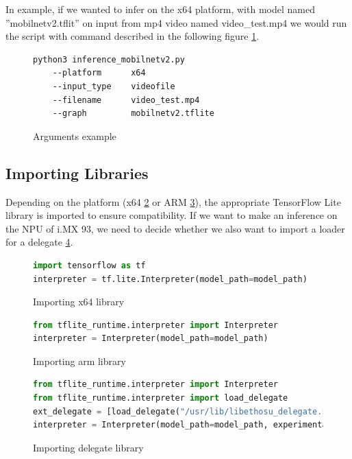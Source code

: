 In example, if we wanted to infer on the x64 platform, with model named ''mobilnetv2.tflit'' on input from mp4 video named video\_test.mp4 we would run the script with command described in the following figure \ref{code:arg_example}.

\begin{figure}[H]
\begin{lstlisting}[language=Bash]
python3 inference_mobilnetv2.py 
    --platform      x64
    --input_type    videofile
    --filename      video_test.mp4
    --graph         mobilnetv2.tflite
\end{lstlisting}
\caption{Arguments example}
\label{code:arg_example}
\end{figure}

\subsection{Importing Libraries}
Depending on the platform (x64 \ref{code:import_libraries} or ARM \ref{code:import_libraries_arm}), the appropriate TensorFlow Lite library is imported to ensure compatibility. If we want to make an inference on the NPU of i.MX 93, we need to decide whether we also want to import a loader for a delegate \ref{code:import_libraries_arm_npu}.

\begin{figure}[H]
\begin{lstlisting}[language=Python]
import tensorflow as tf
interpreter = tf.lite.Interpreter(model_path=model_path)
\end{lstlisting}
\caption{Importing x64 library}
\label{code:import_libraries}
\end{figure}

\begin{figure}[H]
\begin{lstlisting}[language=Python]
from tflite_runtime.interpreter import Interpreter
interpreter = Interpreter(model_path=model_path)

\end{lstlisting}
\caption{Importing arm library}
\label{code:import_libraries_arm}
\end{figure}

\begin{figure}[H]
\begin{lstlisting}[language=Python]
from tflite_runtime.interpreter import Interpreter
from tflite_runtime.interpreter import load_delegate
ext_delegate = [load_delegate("/usr/lib/libethosu_delegate.so")]
interpreter = Interpreter(model_path=model_path, experimental_delegates=ext_delegate)
\end{lstlisting}
\caption{Importing delegate library}
\label{code:import_libraries_arm_npu}
\end{figure}

